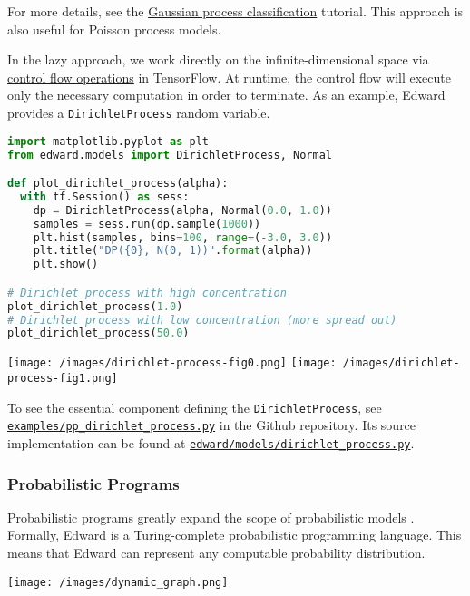 For more details, see the
\href{/tutorials/supervised-classification}{Gaussian process classification}
tutorial. This approach is also useful for Poisson process models.

In the lazy approach, we work directly on the infinite-dimensional space via
\href{https://www.tensorflow.org/api_guides/python/control_flow_ops}{control flow operations}
in TensorFlow. At runtime, the control flow will execute only the
necessary computation in order to terminate. As an example, Edward
provides a \texttt{DirichletProcess} random variable.

\begin{lstlisting}[language=Python]
import matplotlib.pyplot as plt
from edward.models import DirichletProcess, Normal

def plot_dirichlet_process(alpha):
  with tf.Session() as sess:
    dp = DirichletProcess(alpha, Normal(0.0, 1.0))
    samples = sess.run(dp.sample(1000))
    plt.hist(samples, bins=100, range=(-3.0, 3.0))
    plt.title("DP({0}, N(0, 1))".format(alpha))
    plt.show()

# Dirichlet process with high concentration
plot_dirichlet_process(1.0)
# Dirichlet process with low concentration (more spread out)
plot_dirichlet_process(50.0)
\end{lstlisting}

\texttt{[image: /images/dirichlet-process-fig0.png]}
\texttt{[image: /images/dirichlet-process-fig1.png]}

To see the essential component defining the \texttt{DirichletProcess}, see
\href{https://github.com/blei-lab/edward/blob/master/examples/pp_dirichlet_process.py}{\texttt{examples/pp_dirichlet_process.py}}
in the Github repository. Its source implementation can be found at
\href{https://github.com/blei-lab/edward/blob/master/edward/models/dirichlet_process.py}{\texttt{edward/models/dirichlet_process.py}}.

\subsubsection{Probabilistic Programs}

Probabilistic programs greatly expand the scope of probabilistic
models \citep{goodman2012church}.
Formally, Edward is a Turing-complete probabilistic programming
language. This means that Edward can represent any computable
probability distribution.

\texttt{[image: /images/dynamic\_graph.png]}

